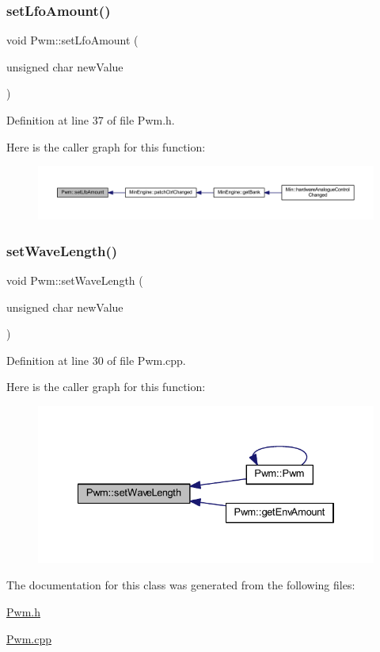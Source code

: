\subsubsection{\texorpdfstring{set\+Lfo\+Amount()}{setLfoAmount()}}
{\footnotesize\ttfamily void Pwm\+::set\+Lfo\+Amount (\begin{DoxyParamCaption}\item[{unsigned char}]{new\+Value }\end{DoxyParamCaption})\hspace{0.3cm}{\ttfamily [inline]}}



Definition at line 37 of file Pwm.\+h.

Here is the caller graph for this function\+:
\nopagebreak
\begin{figure}[H]
\begin{center}
\leavevmode
\includegraphics[width=350pt]{class_pwm_a1fe2ceb8636015244b4d3ed7ef15b333_icgraph}
\end{center}
\end{figure}
\mbox{\label{class_pwm_a65828f1098ab41b17141dd614aa420ec}} 
\subsubsection{\texorpdfstring{set\+Wave\+Length()}{setWaveLength()}}
{\footnotesize\ttfamily void Pwm\+::set\+Wave\+Length (\begin{DoxyParamCaption}\item[{unsigned char}]{new\+Value }\end{DoxyParamCaption})}



Definition at line 30 of file Pwm.\+cpp.

Here is the caller graph for this function\+:
\nopagebreak
\begin{figure}[H]
\begin{center}
\leavevmode
\includegraphics[width=334pt]{class_pwm_a65828f1098ab41b17141dd614aa420ec_icgraph}
\end{center}
\end{figure}


The documentation for this class was generated from the following files\+:\begin{DoxyCompactItemize}
\item 
\hyperlink{_pwm_8h}{Pwm.\+h}\item 
\hyperlink{_pwm_8cpp}{Pwm.\+cpp}\end{DoxyCompactItemize}
